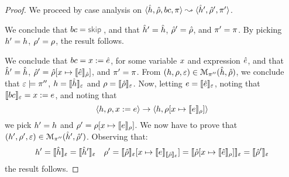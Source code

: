 \begin{proof}
We proceed by case analysis on $\symbtrans{\sheap, \sstore, \bcmd, \pc}{\sheap', \sstore', \pc'}$. 
\vspace{5pt}

\noindent{} 
We conclude that $\bcmd = \jsilskip$, and 
that $\sheap' = \sheap$, $\sstore' = \sstore$, and $\pc' = \pc$. 
By picking $\heap' = \heap$, $\store' = \store$, the result follows. 
\vspace{6pt}

\noindent{} 
We conclude that $\bcmd = \jvar := \sexpr$, for some variable $\jvar$ and expression $\sexpr$, 
and that $\sheap' = \sheap$, $\sstore' = \sstore[\jvar \mapsto \symbeval{\sexpr}{\sstore}]$, and $\pc' = \pc$. 
From $(\heap, \store, \senv) \in \smodels{\sheap, \sstore}{\pc''}$, we conclude that $\senv \satisfies \pc''$,  $\heap = \semexpr{\sheap}{\senv}$ and $\store = \semexpr{\sstore}{\senv}$. 
Now, letting $\jsilexpr = \symbeval{\sexpr}{\senv}$, noting that $\symbeval{\bcmd}{\senv} = \jvar := \jsilexpr$, and noting that 
$$
 \semtrans{\heap, \store, \jvar := \jsilexpr}{\heap, \store[\jvar \mapsto \symbeval{\jsilexpr}{\store}]}
$$
we pick $\heap' = \heap$ and $\store' =  \store[\jvar \mapsto \symbeval{\jsilexpr}{\store}]$. We 
now have to prove that $(\heap', \store', \senv) \in \smodels{\sheap', \sstore'}{\pc''}$.
Observing that: 
$$
\heap' =  \semexpr{\sheap}{\senv} = \semexpr{\sheap'}{\senv} 
\quad 
\store' = \semexpr{\sstore}{\senv}[\jvar \mapsto \symbeval{\jsilexpr}{\semexpr{\sstore}{\senv}}]
   = \semexpr{\sstore[\jvar \mapsto \symbeval{\sexpr}{\store}]}{\senv} 
   = \semexpr{\sstore'}{\senv}
$$
%
the result follows. 
\vspace{6pt}


\end{proof}
